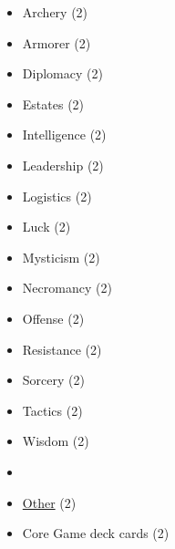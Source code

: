 \begin{multicols}{3}
\begin{itemize}[leftmargin=0pt, label={}, noitemsep, noitemsep]
  \item Archery (2)
  \item Armorer (2)
  \item Diplomacy (2)
  \item Estates (2)
  \item Intelligence (2)
  \item Leadership (2)
  \item Logistics (2)
  \item Luck (2)
  \item Mysticism (2)
  \item Necromancy (2)
  \item Offense (2)
  \item Resistance (2)
  \item Sorcery (2)
  \item Tactics (2)
  \item Wisdom (2)
  \item
  \item \underline{Other} (2)
  \item Core Game deck cards (2)
\end{itemize}

\end{multicols}
